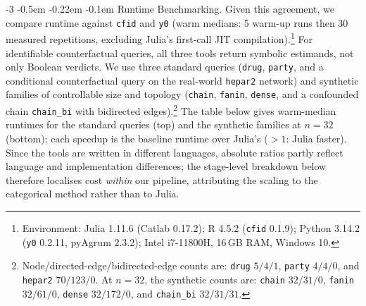 \documentclass[runningheads]{llncs}
\makeatletter
\renewcommand\paragraph{\@startsection{paragraph}{4}{\z@}%
                       {-3\p@ \@plus -2\p@ \@minus -2\p@}%
                       {-0.5em \@plus -0.22em \@minus -0.1em}%
                       {\normalfont\normalsize\bfseries}}
\makeatother
\begin{document}
\paragraph{Runtime Benchmarking.}
Given this agreement, we compare runtime against \texttt{cfid} and \texttt{y0} (warm medians: 5 warm-up runs then 30 measured repetitions, excluding Julia's first-call JIT compilation).\footnote{Environment: Julia 1.11.6 (Catlab 0.17.2); R 4.5.2 (\texttt{cfid} 0.1.9); Python 3.14.2 (\texttt{y0} 0.2.11, pyAgrum 2.3.2); Intel i7-11800H, 16\,GB RAM, Windows 10.} For identifiable counterfactual queries, all three tools return symbolic estimands, not only Boolean verdicts. We use three standard queries (\texttt{drug}, \texttt{party}, and a conditional counterfactual query on the real-world \texttt{hepar2} network) and synthetic families of controllable size and topology (\texttt{chain}, \texttt{fanin}, \texttt{dense}, and a confounded chain \texttt{chain\_bi} with bidirected edges).\footnote{Node/directed-edge/bidirected-edge counts are: \texttt{drug} $5/4/1$, \texttt{party} $4/4/0$, and \texttt{hepar2} $70/123/0$. At $n=32$, the synthetic counts are: \texttt{chain} $32/31/0$, \texttt{fanin} $32/61/0$, \texttt{dense} $32/172/0$, and \texttt{chain\_bi} $32/31/31$.}
The table below gives warm-median runtimes for the standard queries (top) and the synthetic families at $n=32$ (bottom); each speedup is the baseline runtime over Julia's ($>1$: Julia faster). Since the tools are written in different languages, absolute ratios partly reflect language and implementation differences; the stage-level breakdown below therefore localises cost \emph{within} our pipeline, attributing the scaling to the categorical method rather than to Julia.
\end{document}

